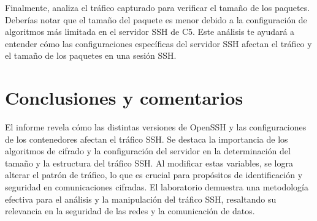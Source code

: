 \documentclass[letter,12pt]{article}
\begin{document}
    Finalmente, analiza el tráfico capturado para verificar el tamaño de los paquetes. Deberías notar que el tamaño del paquete es menor debido a la configuración de algoritmos más limitada en el servidor SSH de C5. Este análisis te ayudará a entender cómo las configuraciones específicas del servidor SSH afectan el tráfico y el tamaño de los paquetes en una sesión SSH. 
\newpage
\section*{Conclusiones y comentarios}
El informe revela cómo las distintas versiones de OpenSSH y las configuraciones de los contenedores afectan el tráfico SSH. Se destaca la importancia de los algoritmos de cifrado y la configuración del servidor en la determinación del tamaño y la estructura del tráfico SSH. Al modificar estas variables, se logra alterar el patrón de tráfico, lo que es crucial para propósitos de identificación y seguridad en comunicaciones cifradas. El laboratorio demuestra una metodología efectiva para el análisis y la manipulación del tráfico SSH, resaltando su relevancia en la seguridad de las redes y la comunicación de datos.
\end{document}
